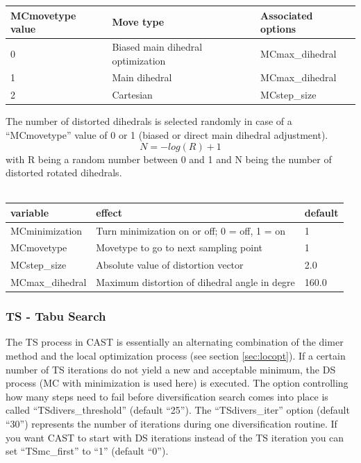 \documentclass[10pt,a4paper]{article} %
\begin{document}
	\begin{longtable}{|p{3cm}|p{5cm}|p{3cm}|}
		MCmovetype value & Move type & Associated options \\
		\hline
		0 & Biased main dihedral optimization & MCmax\_dihedral \\
		1 & Main dihedral & MCmax\_dihedral \\
		2 & Cartesian & MCstep\_size \\
	\end{longtable}

	The number of distorted dihedrals is selected randomly in case of a ``MCmovetype'' value of 0 or 1 (biased or direct main dihedral adjustment).
	\begin{equation}
	N = - log (R) + 1
	\end{equation}
	with R being a random number between 0 and 1 and N being the number of distorted rotated dihedrals.\\~\\
	\begin{longtable}{|p{3.5cm}|p{5cm}|p{2.5cm}|}
		variable & effect & default \\
		\hline
		MCminimization & Turn minimization on or off; 0 = off, 1 = on & 1 \\
		MCmovetype & Movetype to go to next sampling point & 1 \\
		MCstep\_size & Absolute value of distortion vector & 2.0 \\
		MCmax\_dihedral & Maximum distortion of dihedral angle in degre & 160.0 \\
	\end{longtable}
		
	\subsubsection{TS - Tabu Search}
	The \acf{TS} process in \ac{CAST} is essentially an alternating combination of the dimer method\cite{dimermethod} and the local optimization process (see section \ref{sec:locopt}).
	If a certain number of \ac{TS} iterations do not yield a new and acceptable minimum, the \acf{DS} process (\ac{MC} with minimization is used here) is executed. The option controlling how many steps need to fail before diversification search comes into place is called ``TSdivers\_threshold'' (default ``25'').
	The ``TSdivers\_iter'' option (default ``30'') represents the number of iterations during one diversification routine.
	If you want \ac{CAST} to start with \ac{DS} iterations instead of the \ac{TS} iteration you can set ``TSmc\_first'' to ``1'' (default ``0'').\\~\\
	
\end{document}
